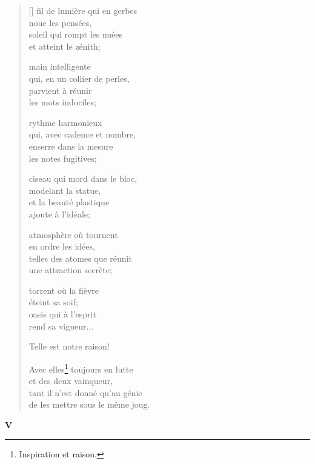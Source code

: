 \documentclass[a4paper,12pt]{book}
\begin{document}
\begin{verse}[\versewidth]
  fil de lumière qui en gerbes \\
  noue les pensées, \\
  soleil qui rompt les nuées \\
  et atteint le zénith;

  main intelligente \\
  qui, en un collier de perles, \\
  parvient à réunir \\
  les mots indociles;

  rythme harmonieux \\
  qui, avec cadence et nombre, \\
  enserre dans la mesure \\
  les notes fugitives;

  ciseau qui mord dans le bloc, \\
  modelant la statue, \\
  et la beauté plastique \\
  ajoute à l'idéale;

  atmosphère où tournent \\
  en ordre les idées, \\
  telles des atomes que réunit \\
  une attraction secrète;

  torrent où la fièvre \\
  éteint sa soif; \\
  oasis qui à l'esprit \\
  rend sa vigueur...

  Telle est notre raison!

  Avec elles\footnote{Inspiration et raison.} toujours en lutte \\
  et des deux vainqueur, \\
  tant il n'est donné qu'au génie \\
  de les mettre sous le même joug.
\end{verse}

\bigskip

\begin{center}
  \textbf{V}
\end{center}

\settowidth{\versewidth}{tant qu'il existera une femme splendide,}
\end{document}
